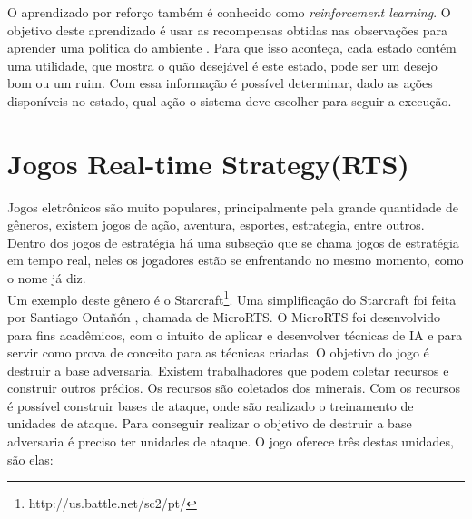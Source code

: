 

O aprendizado por reforço também é conhecido como \textit{reinforcement learning}. O objetivo deste aprendizado é usar as recompensas obtidas nas observações para aprender uma politica do ambiente \cite{intelligence2003modern}. Para que isso aconteça, cada estado contém uma utilidade, que mostra o quão desejável é este estado, pode ser um desejo bom ou um ruim. Com essa informação é possível determinar, dado as ações disponíveis no estado, qual ação o sistema deve escolher para seguir a execução. 




\section{Jogos Real-time Strategy(RTS)} 

Jogos eletrônicos são muito populares, principalmente pela grande quantidade de gêneros, existem jogos de ação, aventura, esportes, estrategia, entre outros. Dentro dos jogos de estratégia há uma subseção que se chama jogos de estratégia em tempo real, neles os jogadores estão se enfrentando no mesmo momento, como o nome já diz. \\

Um exemplo deste gênero é o Starcraft\footnote{http://us.battle.net/sc2/pt/}.  Uma simplificação do Starcraft foi feita por Santiago Ontañón \cite{ontanon2013combinatorial}, chamada de MicroRTS. O MicroRTS foi desenvolvido para fins acadêmicos, com o intuito de aplicar e desenvolver técnicas de IA e para servir como prova de conceito para as técnicas criadas.  O objetivo do jogo é destruir a base adversaria. Existem trabalhadores que podem coletar recursos e construir outros prédios. Os recursos são coletados dos minerais. Com os recursos é possível construir bases de ataque, onde são realizado o treinamento de unidades de ataque. Para conseguir realizar o objetivo de destruir a base adversaria é preciso ter unidades de ataque. O jogo oferece três destas unidades, são elas:

